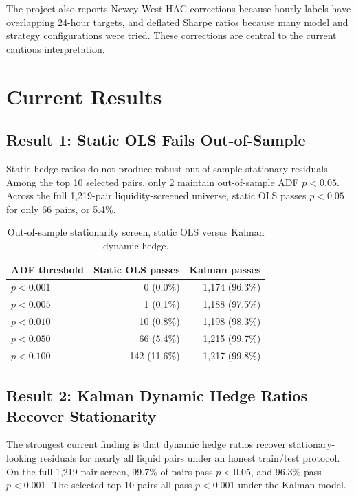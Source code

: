 \documentclass[11pt]{article}
\begin{document}
The project also reports Newey-West HAC corrections because hourly labels have
overlapping 24-hour targets, and deflated Sharpe ratios because many model and
strategy configurations were tried. These corrections are central to the
current cautious interpretation.

\section{Current Results}

\subsection{Result 1: Static OLS Fails Out-of-Sample}

Static hedge ratios do not produce robust out-of-sample stationary residuals.
Among the top 10 selected pairs, only 2 maintain out-of-sample ADF
\(p<0.05\). Across the full 1,219-pair liquidity-screened universe, static OLS
passes \(p<0.05\) for only 66 pairs, or 5.4\%.

\begin{table}[h]
\centering
\caption{Out-of-sample stationarity screen, static OLS versus Kalman dynamic hedge.}
\begin{tabular}{lrr}
\toprule
ADF threshold & Static OLS passes & Kalman passes \\
\midrule
\(p<0.001\) & 0 (0.0\%) & 1,174 (96.3\%) \\
\(p<0.005\) & 1 (0.1\%) & 1,188 (97.5\%) \\
\(p<0.010\) & 10 (0.8\%) & 1,198 (98.3\%) \\
\(p<0.050\) & 66 (5.4\%) & 1,215 (99.7\%) \\
\(p<0.100\) & 142 (11.6\%) & 1,217 (99.8\%) \\
\bottomrule
\end{tabular}
\end{table}

\subsection{Result 2: Kalman Dynamic Hedge Ratios Recover Stationarity}

The strongest current finding is that dynamic hedge ratios recover
stationary-looking residuals for nearly all liquid pairs under an honest
train/test protocol. On the full 1,219-pair screen, 99.7\% of pairs pass
\(p<0.05\), and 96.3\% pass \(p<0.001\). The selected top-10 pairs all pass
\(p<0.001\) under the Kalman model.
\end{document}
